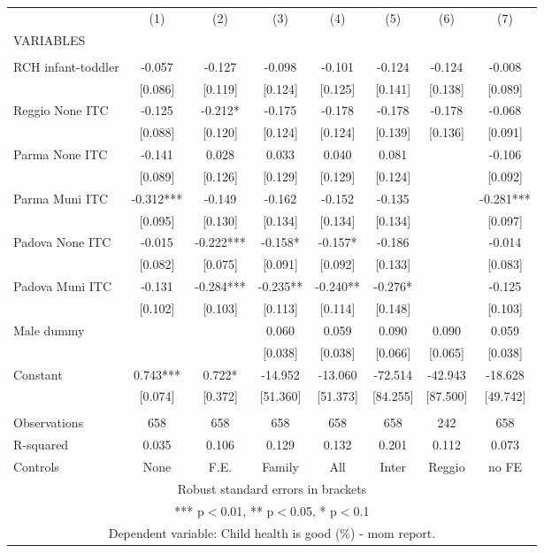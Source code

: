 \begin{tabular}{lccccccc} \hline
 & (1) & (2) & (3) & (4) & (5) & (6) & (7) \\
VARIABLES &  &  &  &  &  &  &  \\ \hline
 &  &  &  &  &  &  &  \\
RCH infant-toddler & -0.057 & -0.127 & -0.098 & -0.101 & -0.124 & -0.124 & -0.008 \\
 & [0.086] & [0.119] & [0.124] & [0.125] & [0.141] & [0.138] & [0.089] \\
Reggio None ITC & -0.125 & -0.212* & -0.175 & -0.178 & -0.178 & -0.178 & -0.068 \\
 & [0.088] & [0.120] & [0.124] & [0.124] & [0.139] & [0.136] & [0.091] \\
Parma None ITC & -0.141 & 0.028 & 0.033 & 0.040 & 0.081 &  & -0.106 \\
 & [0.089] & [0.126] & [0.129] & [0.129] & [0.124] &  & [0.092] \\
Parma Muni ITC & -0.312*** & -0.149 & -0.162 & -0.152 & -0.135 &  & -0.281*** \\
 & [0.095] & [0.130] & [0.134] & [0.134] & [0.134] &  & [0.097] \\
Padova None ITC & -0.015 & -0.222*** & -0.158* & -0.157* & -0.186 &  & -0.014 \\
 & [0.082] & [0.075] & [0.091] & [0.092] & [0.133] &  & [0.083] \\
Padova Muni ITC & -0.131 & -0.284*** & -0.235** & -0.240** & -0.276* &  & -0.125 \\
 & [0.102] & [0.103] & [0.113] & [0.114] & [0.148] &  & [0.103] \\
Male dummy &  &  & 0.060 & 0.059 & 0.090 & 0.090 & 0.059 \\
 &  &  & [0.038] & [0.038] & [0.066] & [0.065] & [0.038] \\
Constant & 0.743*** & 0.722* & -14.952 & -13.060 & -72.514 & -42.943 & -18.628 \\
 & [0.074] & [0.372] & [51.360] & [51.373] & [84.255] & [87.500] & [49.742] \\
 &  &  &  &  &  &  &  \\
Observations & 658 & 658 & 658 & 658 & 658 & 242 & 658 \\
R-squared & 0.035 & 0.106 & 0.129 & 0.132 & 0.201 & 0.112 & 0.073 \\
 Controls & None & F.E. & Family & All & Inter & Reggio & no FE \\ \hline
\multicolumn{8}{c}{ Robust standard errors in brackets} \\
\multicolumn{8}{c}{ *** p$<$0.01, ** p$<$0.05, * p$<$0.1} \\
\multicolumn{8}{c}{ Dependent variable: Child health is good (\%) - mom report.} \\
\end{tabular}
